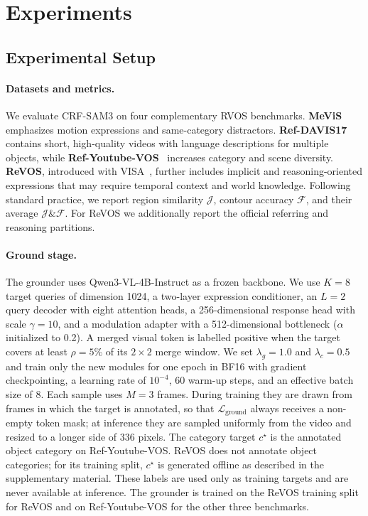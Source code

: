 \section{Experiments}

\subsection{Experimental Setup}
\label{sec:setup}
\paragraph{Datasets and metrics.}
We evaluate CRF-SAM3 on four complementary RVOS benchmarks. \textbf{MeViS}~\cite{ding2023mevis} emphasizes motion expressions and same-category distractors. \textbf{Ref-DAVIS17}~\cite{khoreva2018refdavis} contains short, high-quality videos with language descriptions for multiple objects, while \textbf{Ref-Youtube-VOS}~\cite{seo2020urvos} increases category and scene diversity. \textbf{ReVOS}, introduced with VISA~\cite{yan2024visa}, further includes implicit and reasoning-oriented expressions that may require temporal context and world knowledge. Following standard practice, we report region similarity $\mathcal{J}$, contour accuracy $\mathcal{F}$, and their average $\mathcal{J}\&\mathcal{F}$. For ReVOS we additionally report the official referring and reasoning partitions.

\paragraph{Ground stage.}
The grounder uses Qwen3-VL-4B-Instruct as a frozen backbone. We use $K=8$ target queries of dimension 1024, a two-layer expression conditioner, an $L=2$ query decoder with eight attention heads, a 256-dimensional response head with scale $\gamma=10$, and a modulation adapter with a 512-dimensional bottleneck ($\alpha$ initialized to 0.2). A merged visual token is labelled positive when the target covers at least $\rho=5\%$ of its $2\times2$ merge window. We set $\lambda_g=1.0$ and $\lambda_c=0.5$ and train only the new modules for one epoch in BF16 with gradient checkpointing, a learning rate of $10^{-4}$, 60 warm-up steps, and an effective batch size of 8. Each sample uses $M=3$ frames. During training they are drawn from frames in which the target is annotated, so that $\mathcal{L}_{\mathrm{ground}}$ always receives a non-empty token mask; at inference they are sampled uniformly from the video and resized to a longer side of 336 pixels. The category target $c^{\star}$ is the annotated object category on Ref-Youtube-VOS. ReVOS does not annotate object categories; for its training split, $c^{\star}$ is generated offline as described in the supplementary material. These labels are used only as training targets and are never available at inference. The grounder is trained on the ReVOS training split for ReVOS and on Ref-Youtube-VOS for the other three benchmarks.

